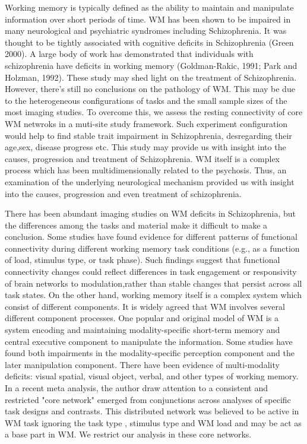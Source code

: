 \documentclass[preprint,authoryear,review,12pt,times]{elsarticle}
\begin{document}
Working memory is typically defined as the ability to maintain and manipulate information over short periods of time. WM has been shown to be impaired in many neurological and psychiatric syndromes including Schizophrenia. It was thought to be tightly associated with cognitive deficits in Schizophrenia (Green 2000). A large body of work has demonstrated that individuals with schizophrenia have deficits in working memory (Goldman-Rakic, 1991; Park and Holzman, 1992). These study may shed light on the treatment of Schizophrenia. However, there's still no conclusions on the pathology of WM. This may be due to the heterogeneous configurations of tasks and the small sample sizes of the most imaging studies. To overcome this, we assess the resting connectivity of core WM netwroks in a muti-site study framework. Such experiment configuration would help to find stable trait impairment in Schizophrenia, desregarding their age,sex, disease progress etc. This study may provide us with insight into the causes, progression and treatment of Schizophrenia. WM itself is a complex process which has been multidimensionally related to the psychosis. Thus, an examination of the underlying neurological mechanism provided us with insight into the causes, progression and even treatment of schizophrenia. 

There has been abundant imaging studies on WM deficits in Schizophrenia, but the differences among the tasks and material make it difficult to make a conclusion.  Some studies have found evidence for different patterns of functional connectivity during different working memory task conditions (e.g., as a function of load, stimulus type, or task phase). Such findings suggest that functional connectivity changes could reflect differences in task engagement or responsivity of brain networks to modulation,rather than stable changes that persist across all task states. On the other hand, working memory itself is a complex system which consist of different components. It is widely agreed that WM involves several different component processes. One popular and original model of WM is a system encoding and maintaining modality-specific short-term memory and central executive component to manipulate the information. Some studies have found both impairments in the modality-specific perception component and the later manipulation component. There have been evidence of multi-modality deficits: visual spatial, visual object, verbal, and other types of working memory. In a recent meta analysis, the author draw attention to a consistent and restricted "core network" emerged from conjunctions across analyses of specific task designs and contrasts. This distributed network was believed to be active in WM task ignoring the task type , stimulus type and WM load and may be act as a base part in WM. We restrict our analysis in these core networks.
\end{document}
